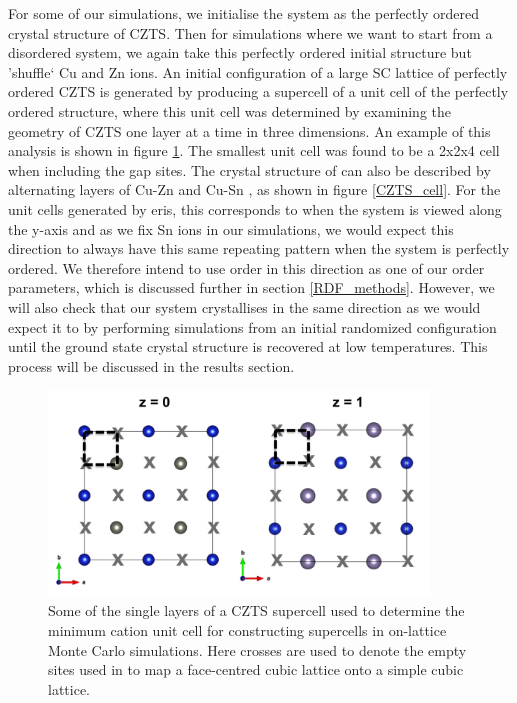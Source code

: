 For some of our simulations, we initialise the system as the perfectly ordered crystal structure of CZTS. Then for simulations where we want to start from a disordered system, we again take this perfectly ordered initial structure but 'shuffle` Cu and Zn ions. An initial configuration of a large SC lattice of perfectly ordered CZTS is generated by producing a supercell of a unit cell of the perfectly ordered structure, where this unit cell was determined by examining the geometry of CZTS one layer at a time in three dimensions. An example of this analysis is shown in figure \ref{unit_cell_eris_supercell}. The smallest unit cell was found to be a 2x2x4 cell when including the gap sites. The crystal structure of {\CZTS } can also be described by alternating layers of Cu-Zn and Cu-Sn \cite{Schorr}, as shown in figure \ref{CZTS_cell}. For the unit cells generated by eris, this corresponds to when the system is viewed along the y-axis and as we fix Sn ions in our simulations, we would expect this direction to always have this same repeating pattern when the system is perfectly ordered. We therefore intend to use order in this direction as one of our order parameters, which is discussed further in section \ref{RDF_methods}. However, we will also check that our system crystallises in the same direction as we would expect it to by performing simulations from an initial randomized configuration until the ground state crystal structure is recovered at low temperatures. This process will be discussed in the results section.\\

\begin{figure}[h!]
  \centering
    \includegraphics[width=0.9\textwidth]{figures/unit_cell_eris_supercell.png}
    \caption{Some of the single layers of a CZTS supercell used to determine the minimum cation unit cell for constructing supercells in on-lattice Monte Carlo simulations. Here crosses are used to denote the empty sites used in to map a face-centred cubic lattice onto a simple cubic lattice.}
  \label{unit_cell_eris_supercell}
\end{figure}

